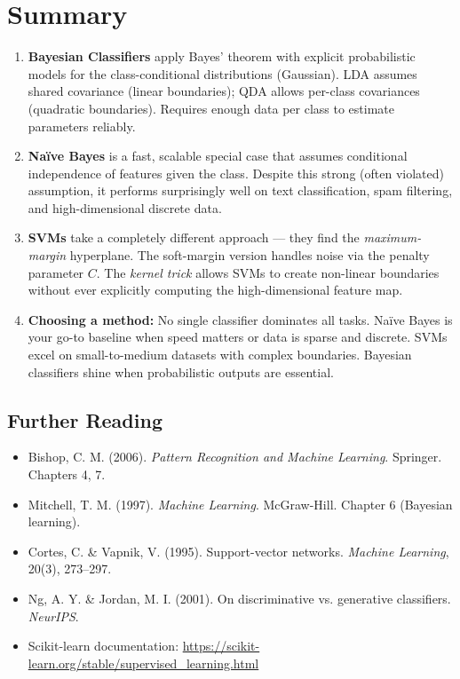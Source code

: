 \documentclass[12pt,a4paper]{article}
\begin{document}
\section{Summary}

\begin{tcolorbox}[notebox, title={Lecture Summary}]
\begin{enumerate}[leftmargin=1.5em, itemsep=4pt]
  \item \textbf{Bayesian Classifiers} apply Bayes' theorem with explicit probabilistic models for the class-conditional distributions (Gaussian). LDA assumes shared covariance (linear boundaries); QDA allows per-class covariances (quadratic boundaries). Requires enough data per class to estimate parameters reliably.

  \item \textbf{Na\"{i}ve Bayes} is a fast, scalable special case that assumes conditional independence of features given the class. Despite this strong (often violated) assumption, it performs surprisingly well on text classification, spam filtering, and high-dimensional discrete data.

  \item \textbf{SVMs} take a completely different approach — they find the \emph{maximum-margin} hyperplane. The soft-margin version handles noise via the penalty parameter $C$. The \emph{kernel trick} allows SVMs to create non-linear boundaries without ever explicitly computing the high-dimensional feature map.

  \item \textbf{Choosing a method:} No single classifier dominates all tasks. Na\"{i}ve Bayes is your go-to baseline when speed matters or data is sparse and discrete. SVMs excel on small-to-medium datasets with complex boundaries. Bayesian classifiers shine when probabilistic outputs are essential.
\end{enumerate}
\end{tcolorbox}

\subsection*{Further Reading}
\begin{itemize}[itemsep=3pt]
  \item Bishop, C. M. (2006). \textit{Pattern Recognition and Machine Learning}. Springer. Chapters 4, 7.
  \item Mitchell, T. M. (1997). \textit{Machine Learning}. McGraw-Hill. Chapter 6 (Bayesian learning).
  \item Cortes, C. \& Vapnik, V. (1995). Support-vector networks. \textit{Machine Learning}, 20(3), 273–297.
  \item Ng, A. Y. \& Jordan, M. I. (2001). On discriminative vs. generative classifiers. \textit{NeurIPS}.
  \item Scikit-learn documentation: \url{https://scikit-learn.org/stable/supervised_learning.html}
\end{itemize}
\end{document}
